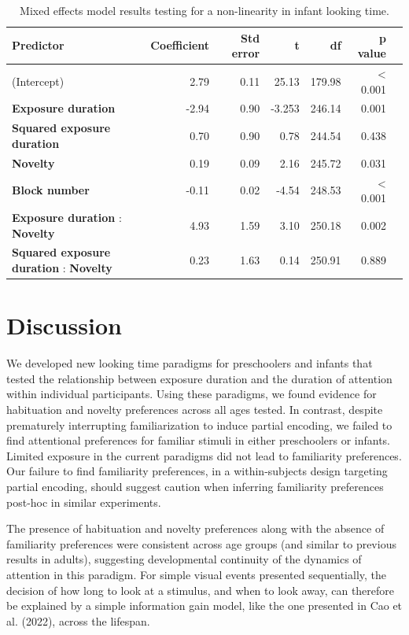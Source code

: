 \documentclass[10pt, letterpaper]{article}
\begin{document}
\captionsetup{belowskip=5pt,aboveskip=5pt}

\begin{table}[t]
\centering
\begin{tabular}{lrrrrrr}
  \hline
 Predictor & Coefficient & Std error & t & df & p value \\ 
  \hline
(Intercept) & 2.79 & 0.11 & 25.13 & 179.98 & \textless{ 0.001} \\ 
  \textbf{Exposure duration} & -2.94 & 0.90 & -3.253 & 246.14 & 0.001 \\ 
  \textbf{Squared exposure duration} & 0.70 & 0.90 & 0.78 & 244.54 & 0.438 \\ 
  \textbf{Novelty} & 0.19 & 0.09 & 2.16 & 245.72 & 0.031 \\ 
  \textbf{Block number} & -0.11 & 0.02 & -4.54 & 248.53 & \textless{ 0.001} \\ 
  \textbf{Exposure duration} : \textbf{Novelty} & 4.93 & 1.59 & 3.10 & 250.18 & 0.002 \\ 
  \textbf{Squared exposure duration} : \textbf{Novelty} & 0.23 & 1.63 & 0.14 & 250.91 & 0.889 \\ 
   \hline
\end{tabular}
\caption{Mixed effects model results testing for a non-linearity in infant looking time.}\label{wrap-tab:1}
\end{table}

\hypertarget{discussion}{%
\section{Discussion}\label{discussion}}

We developed new looking time paradigms for preschoolers and infants
that tested the relationship between exposure duration and the duration
of attention within individual participants. Using these paradigms, we
found evidence for habituation and novelty preferences across all ages
tested. In contrast, despite prematurely interrupting familiarization to
induce partial encoding, we failed to find attentional preferences for
familiar stimuli in either preschoolers or infants. Limited exposure in
the current paradigms did not lead to familiarity preferences. Our
failure to find familiarity preferences, in a within-subjects design
targeting partial encoding, should suggest caution when inferring
familiarity preferences post-hoc in similar experiments.

The presence of habituation and novelty preferences along with the
absence of familiarity preferences were consistent across age groups
(and similar to previous results in adults), suggesting developmental
continuity of the dynamics of attention in this paradigm. For simple
visual events presented sequentially, the decision of how long to look
at a stimulus, and when to look away, can therefore be explained by a
simple information gain model, like the one presented in Cao et al.
(2022), across the lifespan.
\end{document}
